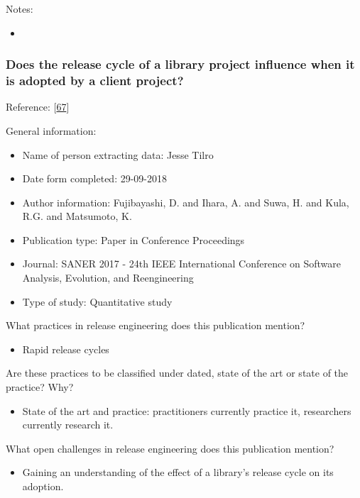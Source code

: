 \documentclass[]{book}
\providecommand{\tightlist}{%
  \setlength{\itemsep}{0pt}\setlength{\parskip}{0pt}}
\begin{document}
Notes:

\begin{itemize}
\item
\end{itemize}

\subsubsection{Does the release cycle of a library project influence
when it is adopted by a client
project?}\label{does-the-release-cycle-of-a-library-project-influence-when-it-is-adopted-by-a-client-project}

Reference: {[}\protect\hyperlink{ref-fujibayashi2017a}{67}{]}

General information:

\begin{itemize}
\tightlist
\item
  Name of person extracting data: Jesse Tilro
\item
  Date form completed: 29-09-2018
\item
  Author information: Fujibayashi, D. and Ihara, A. and Suwa, H. and
  Kula, R.G. and Matsumoto, K.
\item
  Publication type: Paper in Conference Proceedings
\item
  Journal: SANER 2017 - 24th IEEE International Conference on Software
  Analysis, Evolution, and Reengineering
\item
  Type of study: Quantitative study
\end{itemize}

What practices in release engineering does this publication mention?

\begin{itemize}
\tightlist
\item
  Rapid release cycles
\end{itemize}

Are these practices to be classified under dated, state of the art or
state of the practice? Why?

\begin{itemize}
\tightlist
\item
  State of the art and practice: practitioners currently practice it,
  researchers currently research it.
\end{itemize}

What open challenges in release engineering does this publication
mention?

\begin{itemize}
\tightlist
\item
  Gaining an understanding of the effect of a library's release cycle on
  its adoption.
\end{itemize}
\end{document}
